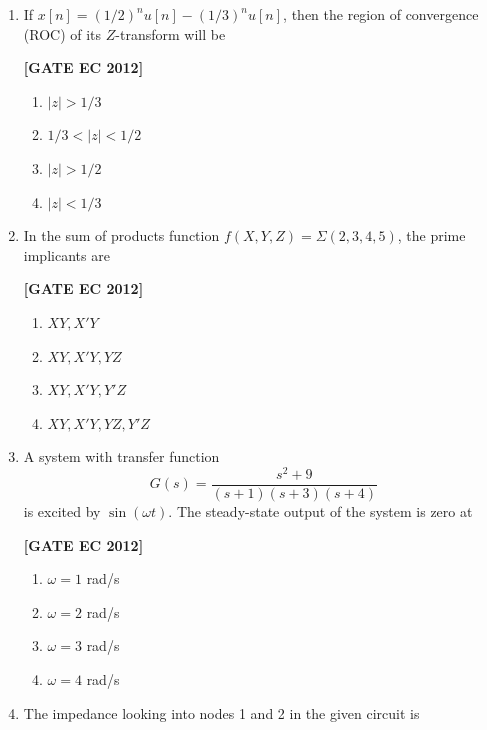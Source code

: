 \documentclass[12pt]{article}
\begin{document}
\begin{enumerate}[leftmargin=1.0em, label=\textbf{Q.\arabic*.}, itemsep=2em]
\item If $x[n] = (1/2)^n u[n] - (1/3)^n u[n]$, then the region of convergence (ROC) of its $Z$-transform will be

\noindent \textbf{[GATE EC 2012]}
\begin{multicols}{2}
    \begin{enumerate}
        \item $|z| > 1/3$
        \item $1/3 < |z| < 1/2$
        \item $|z| > 1/2$
        \item $|z| < 1/3$
    \end{enumerate}
\end{multicols}

\item In the sum of products function $f(X,Y,Z) = \Sigma(2,3,4,5)$, the prime implicants are

\noindent \textbf{[GATE EC 2012]}
\begin{multicols}{2}
    \begin{enumerate}
        \item $XY, X'Y$
        \item $XY, X'Y, YZ$
        \item $XY, X'Y, Y'Z$
        \item $XY, X'Y, YZ, Y'Z$
    \end{enumerate}
\end{multicols}

\item A system with transfer function
\[
G(s) = \frac{s^2+9}{(s+1)(s+3)(s+4)}
\]
is excited by $\sin(\omega t)$. The steady-state output of the system is zero at

\noindent \textbf{[GATE EC 2012]}
\begin{multicols}{2}
    \begin{enumerate}
        \item $\omega = 1$ rad/s
        \item $\omega = 2$ rad/s
        \item $\omega = 3$ rad/s
        \item $\omega = 4$ rad/s
    \end{enumerate}
\end{multicols}

\item The impedance looking into nodes 1 and 2 in the given circuit is


\end{enumerate}
\end{document}
